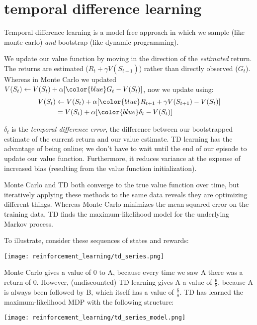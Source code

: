 \section{temporal difference learning}
Temporal difference learning is a model free approach in which we sample (like monte carlo) \textit{and} bootstrap (like dynamic programming).

We update our value function by moving in the direction of the \textit{estimated} return. The returns are estimated ($R_t + \gamma V(S_{t+1})$) rather than directly observed ($G_t$). Whereas in Monte Carlo we updated $V(S_t) \leftarrow V(S_t) + \alpha [{\color{blue}G_t} - V(S_t)]$, now we update using:
\begin{align*}
V(S_t)
&\leftarrow V(S_t) + \alpha [{\color{blue}R_{t+1} + \gamma V(S_{t+1})} - V(S_t)] \\
&= V(S_t) + \alpha [{\color{blue}\delta_t} - V(S_t)]
\end{align*}

$\delta_t$ is the \textit{temporal difference error}, the difference between our bootstrapped estimate of the current return and our value estimate. TD learning has the advantage of being online; we don't have to wait until the end of our episode to update our value function. Furthermore, it reduces variance at the expense of increased bias (resulting from the value function initialization).

Monte Carlo and TD both converge to the true value function over time, but iteratively applying these methods to the same data reveals they are optimizing different things. Whereas Monte Carlo minimizes the mean squared error on the training data, TD finds the maximum-likelihood model for the underlying Markov process.

To illustrate, consider these sequences of states and rewards:
\begin{center}\texttt{[image: reinforcement\_learning/td\_series.png]}\end{center}

Monte Carlo gives a value of 0 to A, because every time we saw A there was a return of 0. However, (undiscounted) TD learning gives A a value of $\frac{6}{8}$, because A is always been followed by B, which itself has a value of $\frac{6}{8}$. TD has learned the maximum-likelihood MDP with the following structure:

\begin{center}\texttt{[image: reinforcement\_learning/td\_series\_model.png]}\end{center}

